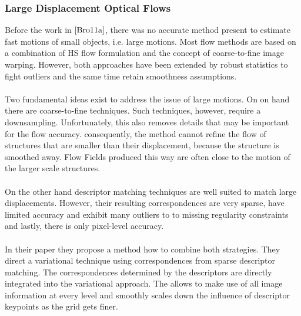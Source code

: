 \subsubsection{Large Displacement Optical Flows}
Before the work in $\cite{Bro11a}$, there was no accurate method present to estimate fast motions of small objects, i.e. large motions. Most flow methods are based on a combination of HS flow formulation and the concept of coarse-to-fine image warping. However, both approaches have been extended by robust statistics to fight outliers and the same time retain smoothness assumptions. \\ \\
Two fundamental ideas exist to address the issue of large motions. On on hand there are coarse-to-fine techniques. Such techniques, however, require a downsampling. Unfortunately, this also removes details that may be important for the flow accuracy. consequently, the method cannot refine the flow of structures that are smaller than their displacement, because the structure is smoothed away. Flow Fields produced this way are often close to the motion of the larger scale structures. \\ \\
On the other hand descriptor matching techniques are well suited to match large displacements. However, their resulting correspondences are very sparse, have limited accuracy and exhibit many outliers to to missing regularity constraints and lastly, there is only pixel-level accuracy. \\ \\
In their paper they propose a method how to combine both strategies. They direct a variational technique using correspondences from sparse descriptor matching. The correspondences determined by the descriptors are directly integrated into the variational approach. The allows to make use of all image information at every level and smoothly scales down the influence of descriptor keypoints as the grid gets finer.

